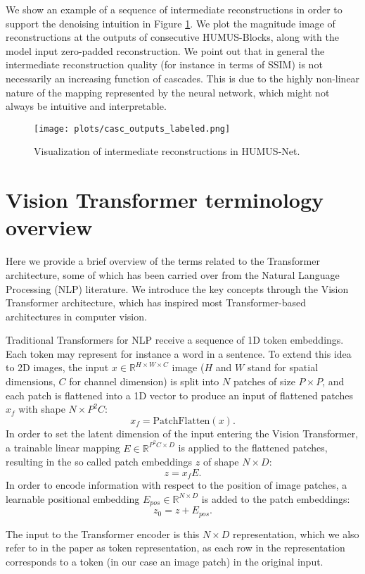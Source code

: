	We show an example of a sequence of intermediate reconstructions in order to support the denoising intuition in Figure \ref{fig:apx_casc_vis}. We plot the magnitude image of reconstructions at the outputs of consecutive HUMUS-Blocks, along with the model input zero-padded reconstruction. We point out that in general  the intermediate reconstruction quality (for instance in terms of SSIM) is not necessarily an increasing function of cascades. This is due to the highly non-linear nature of the mapping represented by the neural network, which might not always be intuitive and interpretable.

\begin{figure}
	\centering
	\texttt{[image: plots/casc\_outputs\_labeled.png]}	
	\caption{Visualization of intermediate reconstructions in HUMUS-Net. \label{fig:apx_casc_vis}}
\end{figure}

\section{Vision Transformer terminology overview \label{apx:vit_term}}
Here we provide a brief overview of the terms related to the Transformer architecture, some of which has been carried over from the Natural Language Processing (NLP) literature.  We introduce the key concepts through the Vision Transformer architecture, which has inspired most Transformer-based architectures in computer vision.

Traditional Transformers for NLP receive a sequence of 1D token embeddings. Each token may represent for instance a word in a sentence. To extend this idea to 2D images, the input $x \in \mathbb{R}^{H \times W \times C}$ image ($H$ and $W$ stand for spatial dimensions, $C$ for channel dimension) is split into $N$ patches of size $P \times P$, and each patch is flattened into a 1D vector to produce an input of flattened patches $x_f$ with shape $N \times P^2 C$:
$$ x_f = \text{PatchFlatten}(x). $$
 In order to set the latent dimension of the input entering the Vision Transformer, a trainable linear mapping $E \in \mathbb{R}^{P^2 C \times D}$ is applied to the flattened patches, resulting in the so called patch embeddings $z$ of shape $N \times D$:
 $$ z = x_f E.$$
 In order to encode information with respect to the position of image patches, a learnable positional embedding $E_{pos} \in \mathbb{R}^{N \times D}$ is added to the patch embeddings:
 $$z_0 = z + E_{pos} .$$
 
 The input to the Transformer encoder is this $N \times D$ representation, which we also refer to in the paper as token representation, as each row in the representation corresponds to a token (in our case an image patch) in the original input.  
\newpage
